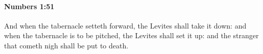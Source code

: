 
		\paragraph{Numbers 1:51} %
			\label{NUMBERS-1-51}

			And when the tabernacle setteth forward, the Levites shall take it down: and when the tabernacle is to be pitched, the Levites shall set it up: and the stranger that cometh nigh shall be put to death.


